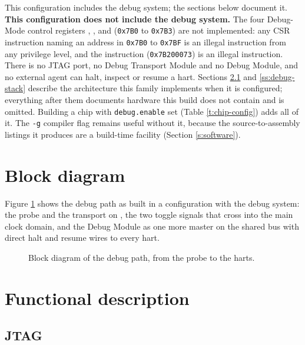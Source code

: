 \ifdebugenable
This configuration includes the debug system; the sections below document it.
\else
\textbf{This configuration does not include the debug system.} The four Debug-Mode control registers , ,  and  (\texttt{0x7B0} to \texttt{0x7B3}) are not implemented: any CSR instruction naming an address in \texttt{0x7B0} to \texttt{0x7BF} is an illegal instruction from any privilege level, and the  instruction (\texttt{0x7B200073}) is an illegal instruction. There is no JTAG port, no Debug Transport Module and no Debug Module, and no external agent can halt, inspect or resume a hart. Sections \ref{ss:debug-jtag} and \ref{ss:debug-stack} describe the architecture this family implements when it is configured; everything after them documents hardware this build does not contain and is omitted. Building a chip with \texttt{debug.enable} set (Table \ref{t:chip-config}) adds all of it. The \texttt{-g} compiler flag remains useful without it, because the source-to-assembly listings it produces are a build-time facility (Section \ref{s:software}).
\fi

\section{Block diagram}

Figure \ref{fig:debug-stack} shows the debug path as built in a configuration with the debug system: the probe and the transport on , the two toggle signals that cross into the main clock domain, and the Debug Module as one more master on the shared bus with direct halt and resume wires to every hart.

\begin{figure}[htpb]
	\centering
	
	\caption{Block diagram of the debug path, from the probe to the harts.}
	\label{fig:debug-stack}
\end{figure}

\section{Functional description}

\subsection{JTAG} \label{ss:debug-jtag}

